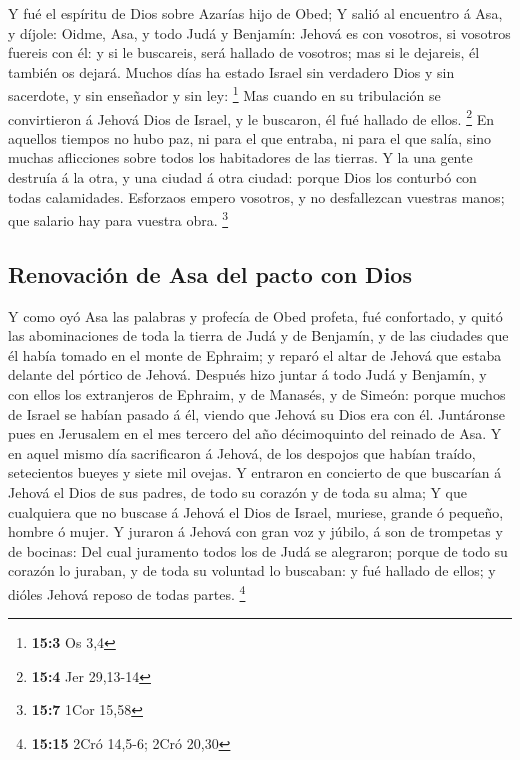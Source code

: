  Y fué el espíritu de Dios sobre Azarías hijo de Obed;
 Y salió al encuentro á Asa, y díjole: Oidme, Asa, y todo
Judá y Benjamín: Jehová es con vosotros, si vosotros fuereis con él: y
si le buscareis, será hallado de vosotros; mas si le dejareis, él
también os dejará.  Muchos días ha estado Israel sin
verdadero Dios y sin sacerdote, y sin enseñador y sin ley: \footnote{\textbf{15:3}
  Os 3,4}  Mas cuando en su tribulación se convirtieron á
Jehová Dios de Israel, y le buscaron, él fué hallado de ellos.
\footnote{\textbf{15:4} Jer 29,13-14}  En aquellos tiempos
no hubo paz, ni para el que entraba, ni para el que salía, sino muchas
aflicciones sobre todos los habitadores de las tierras.  Y
la una gente destruía á la otra, y una ciudad á otra ciudad: porque Dios
los conturbó con todas calamidades.  Esforzaos empero
vosotros, y no desfallezcan vuestras manos; que salario hay para vuestra
obra. \footnote{\textbf{15:7} 1Cor 15,58}

\hypertarget{renovaciuxf3n-de-asa-del-pacto-con-dios}{%
\subsection{Renovación de Asa del pacto con
Dios}\label{renovaciuxf3n-de-asa-del-pacto-con-dios}}

 Y como oyó Asa las palabras y profecía de Obed profeta, fué
confortado, y quitó las abominaciones de toda la tierra de Judá y de
Benjamín, y de las ciudades que él había tomado en el monte de Ephraim;
y reparó el altar de Jehová que estaba delante del pórtico de Jehová.
 Después hizo juntar á todo Judá y Benjamín, y con ellos los
extranjeros de Ephraim, y de Manasés, y de Simeón: porque muchos de
Israel se habían pasado á él, viendo que Jehová su Dios era con él.
 Juntáronse pues en Jerusalem en el mes tercero del año
décimoquinto del reinado de Asa.  Y en aquel mismo día
sacrificaron á Jehová, de los despojos que habían traído, setecientos
bueyes y siete mil ovejas.  Y entraron en concierto de que
buscarían á Jehová el Dios de sus padres, de todo su corazón y de toda
su alma;  Y que cualquiera que no buscase á Jehová el Dios
de Israel, muriese, grande ó pequeño, hombre ó mujer.  Y
juraron á Jehová con gran voz y júbilo, á son de trompetas y de bocinas:
 Del cual juramento todos los de Judá se alegraron; porque
de todo su corazón lo juraban, y de toda su voluntad lo buscaban: y fué
hallado de ellos; y dióles Jehová reposo de todas partes. \footnote{\textbf{15:15}
  2Cró 14,5-6; 2Cró 20,30}

